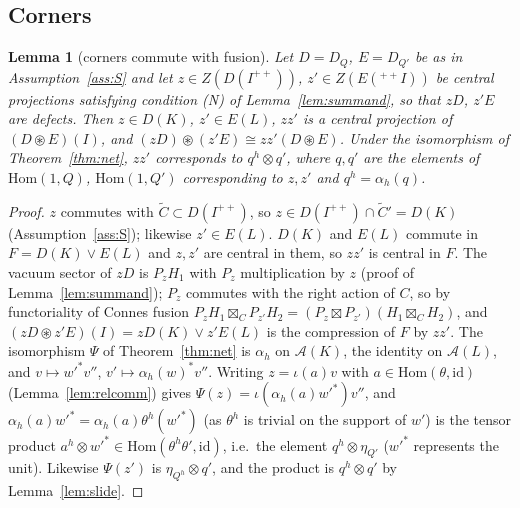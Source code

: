 \documentclass[11pt]{article}
\newtheorem{lemma}[theorem]{Lemma}
\theoremstyle{definition}
\theoremstyle{remark}
\newcommand{\cA}{\mathcal A}
\newcommand{\fus}{\boxtimes}
\newcommand{\cfus}{\circledast}
\begin{document}
\subsection{Corners}
\begin{lemma}[corners commute with fusion]\label{lem:cornerfus}
Let $D=D_Q$, $E=D_{Q'}$ be as in Assumption~\ref{ass:S} and let $z\in Z(D(I^{++}))$, $z'\in Z(E({}^{++}I))$ be central projections satisfying condition (N) of Lemma~\ref{lem:summand}, so that $zD$, $z'E$ are defects. Then $z\in D(K)$, $z'\in E(L)$, $zz'$ is a central projection of $(D\cfus E)(I)$, and $(zD)\cfus(z'E)\cong zz'(D\cfus E)$. Under the isomorphism of Theorem~\ref{thm:net}, $zz'$ corresponds to $q^h\otimes q'$, where $q,q'$ are the elements of $\mathrm{Hom}(1,Q)$, $\mathrm{Hom}(1,Q')$ corresponding to $z,z'$ and $q^h=\alpha_h(q)$.
\end{lemma}
\begin{proof}
$z$ commutes with $\tilde C\subset D(I^{++})$, so $z\in D(I^{++})\cap\tilde C'=D(K)$ (Assumption~\ref{ass:S}); likewise $z'\in E(L)$. $D(K)$ and $E(L)$ commute in $F=D(K)\vee E(L)$ and $z,z'$ are central in them, so $zz'$ is central in $F$. The vacuum sector of $zD$ is $P_zH_1$ with $P_z$ multiplication by $z$ (proof of Lemma~\ref{lem:summand}); $P_z$ commutes with the right action of $C$, so by functoriality of Connes fusion $P_zH_1\fus_CP_{z'}H_2=(P_z\fus P_{z'})(H_1\fus_CH_2)$, and $(zD\cfus z'E)(I)=zD(K)\vee z'E(L)$ is the compression of $F$ by $zz'$. The isomorphism $\Psi$ of Theorem~\ref{thm:net} is $\alpha_h$ on $\cA(K)$, the identity on $\cA(L)$, and $v\mapsto w'^*v''$, $v'\mapsto\alpha_h(w)^*v''$. Writing $z=\iota(a)v$ with $a\in\mathrm{Hom}(\theta,\mathrm{id})$ (Lemma~\ref{lem:relcomm}) gives $\Psi(z)=\iota(\alpha_h(a)w'^*)v''$, and $\alpha_h(a)w'^*=\alpha_h(a)\theta^h(w'^*)$ (as $\theta^h$ is trivial on the support of $w'$) is the tensor product $a^h\otimes w'^*\in\mathrm{Hom}(\theta^h\theta',\mathrm{id})$, i.e.\ the element $q^h\otimes\eta_{Q'}$ ($w'^*$ represents the unit). Likewise $\Psi(z')$ is $\eta_{Q^h}\otimes q'$, and the product is $q^h\otimes q'$ by Lemma~\ref{lem:slide}.
\end{proof}
\end{document}
